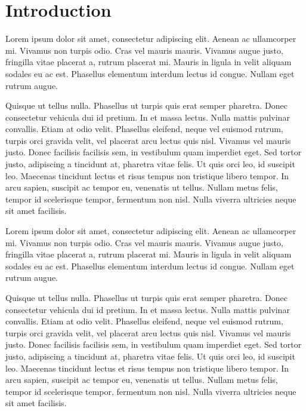 \chapter*{Introduction}

Lorem ipsum dolor sit amet, consectetur adipiscing elit. Aenean ac
ullamcorper mi. Vivamus non turpis odio. Cras vel mauris mauris. Vivamus
augue justo, fringilla vitae placerat a, rutrum placerat mi. Mauris in
ligula in velit aliquam sodales eu ac est. Phasellus elementum interdum
lectus id congue. Nullam eget rutrum augue.

Quisque ut tellus nulla. Phasellus ut turpis quis erat semper pharetra.
Donec consectetur vehicula dui id pretium. In et massa lectus. Nulla mattis
pulvinar convallis. Etiam at odio velit. Phasellus eleifend, neque vel
euismod rutrum, turpis orci gravida velit, vel placerat arcu lectus quis
nisl. Vivamus vel mauris justo. Donec facilisis facilisis sem, in vestibulum
quam imperdiet eget. Sed tortor justo, adipiscing a tincidunt at, pharetra
vitae felis. Ut quis orci leo, id suscipit leo. Maecenas tincidunt lectus et
risus tempus non tristique libero tempor. In arcu sapien, suscipit ac tempor
eu, venenatis ut tellus. Nullam metus felis, tempor id scelerisque tempor,
fermentum non nisl. Nulla viverra ultricies neque sit amet facilisis.

Lorem ipsum dolor sit amet, consectetur adipiscing elit. Aenean ac
ullamcorper mi. Vivamus non turpis odio. Cras vel mauris mauris. Vivamus
augue justo, fringilla vitae placerat a, rutrum placerat mi. Mauris in
ligula in velit aliquam sodales eu ac est. Phasellus elementum interdum
lectus id congue. Nullam eget rutrum augue.

Quisque ut tellus nulla. Phasellus ut turpis quis erat semper pharetra.
Donec consectetur vehicula dui id pretium. In et massa lectus. Nulla mattis
pulvinar convallis. Etiam at odio velit. Phasellus eleifend, neque vel
euismod rutrum, turpis orci gravida velit, vel placerat arcu lectus quis
nisl. Vivamus vel mauris justo. Donec facilisis facilisis sem, in vestibulum
quam imperdiet eget. Sed tortor justo, adipiscing a tincidunt at, pharetra
vitae felis. Ut quis orci leo, id suscipit leo. Maecenas tincidunt lectus et
risus tempus non tristique libero tempor. In arcu sapien, suscipit ac tempor
eu, venenatis ut tellus. Nullam metus felis, tempor id scelerisque tempor,
fermentum non nisl. Nulla viverra ultricies neque sit amet facilisis.
  
